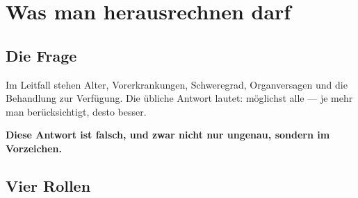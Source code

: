 \chapter{Was man herausrechnen darf}

\section{Die Frage}

\begin{merksatz}
Im Leitfall stehen Alter, Vorerkrankungen, Schweregrad, Organversagen und die Behandlung zur Verfügung. Die übliche Antwort lautet: möglichst alle --- je mehr man berücksichtigt, desto besser.

\begin{center}
\begin{minipage}{0.9\textwidth}
\textbf{Diese Antwort ist falsch, und zwar nicht nur ungenau, sondern im Vorzeichen.}
\end{minipage}
\end{center}

\begin{center}
\begin{minipage}{0.88\textwidth}
\end{minipage}
\end{center}
\end{merksatz}

\section{Vier Rollen}

